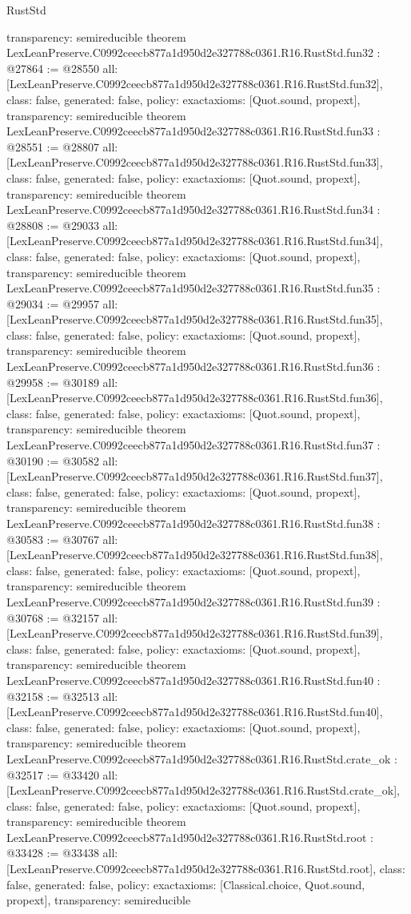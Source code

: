 \begin{lexlean}{RustStd}
\begin{coremodule}
{  transparency: semireducible
}
theorem LexLeanPreserve.C0992ceecb877a1d950d2e327788c0361.R16.RustStd.fun32 : @27864 := @28550 {
  all: [LexLeanPreserve.C0992ceecb877a1d950d2e327788c0361.R16.RustStd.fun32],
  class: false,
  generated: false,
  policy: exact{axioms: [Quot.sound, propext]},
  transparency: semireducible
}
theorem LexLeanPreserve.C0992ceecb877a1d950d2e327788c0361.R16.RustStd.fun33 : @28551 := @28807 {
  all: [LexLeanPreserve.C0992ceecb877a1d950d2e327788c0361.R16.RustStd.fun33],
  class: false,
  generated: false,
  policy: exact{axioms: [Quot.sound, propext]},
  transparency: semireducible
}
theorem LexLeanPreserve.C0992ceecb877a1d950d2e327788c0361.R16.RustStd.fun34 : @28808 := @29033 {
  all: [LexLeanPreserve.C0992ceecb877a1d950d2e327788c0361.R16.RustStd.fun34],
  class: false,
  generated: false,
  policy: exact{axioms: [Quot.sound, propext]},
  transparency: semireducible
}
theorem LexLeanPreserve.C0992ceecb877a1d950d2e327788c0361.R16.RustStd.fun35 : @29034 := @29957 {
  all: [LexLeanPreserve.C0992ceecb877a1d950d2e327788c0361.R16.RustStd.fun35],
  class: false,
  generated: false,
  policy: exact{axioms: [Quot.sound, propext]},
  transparency: semireducible
}
theorem LexLeanPreserve.C0992ceecb877a1d950d2e327788c0361.R16.RustStd.fun36 : @29958 := @30189 {
  all: [LexLeanPreserve.C0992ceecb877a1d950d2e327788c0361.R16.RustStd.fun36],
  class: false,
  generated: false,
  policy: exact{axioms: [Quot.sound, propext]},
  transparency: semireducible
}
theorem LexLeanPreserve.C0992ceecb877a1d950d2e327788c0361.R16.RustStd.fun37 : @30190 := @30582 {
  all: [LexLeanPreserve.C0992ceecb877a1d950d2e327788c0361.R16.RustStd.fun37],
  class: false,
  generated: false,
  policy: exact{axioms: [Quot.sound, propext]},
  transparency: semireducible
}
theorem LexLeanPreserve.C0992ceecb877a1d950d2e327788c0361.R16.RustStd.fun38 : @30583 := @30767 {
  all: [LexLeanPreserve.C0992ceecb877a1d950d2e327788c0361.R16.RustStd.fun38],
  class: false,
  generated: false,
  policy: exact{axioms: [Quot.sound, propext]},
  transparency: semireducible
}
theorem LexLeanPreserve.C0992ceecb877a1d950d2e327788c0361.R16.RustStd.fun39 : @30768 := @32157 {
  all: [LexLeanPreserve.C0992ceecb877a1d950d2e327788c0361.R16.RustStd.fun39],
  class: false,
  generated: false,
  policy: exact{axioms: [Quot.sound, propext]},
  transparency: semireducible
}
theorem LexLeanPreserve.C0992ceecb877a1d950d2e327788c0361.R16.RustStd.fun40 : @32158 := @32513 {
  all: [LexLeanPreserve.C0992ceecb877a1d950d2e327788c0361.R16.RustStd.fun40],
  class: false,
  generated: false,
  policy: exact{axioms: [Quot.sound, propext]},
  transparency: semireducible
}
theorem LexLeanPreserve.C0992ceecb877a1d950d2e327788c0361.R16.RustStd.crate_ok : @32517 := @33420 {
  all: [LexLeanPreserve.C0992ceecb877a1d950d2e327788c0361.R16.RustStd.crate_ok],
  class: false,
  generated: false,
  policy: exact{axioms: [Quot.sound, propext]},
  transparency: semireducible
}
theorem LexLeanPreserve.C0992ceecb877a1d950d2e327788c0361.R16.RustStd.root : @33428 := @33438 {
  all: [LexLeanPreserve.C0992ceecb877a1d950d2e327788c0361.R16.RustStd.root],
  class: false,
  generated: false,
  policy: exact{axioms: [Classical.choice, Quot.sound, propext]},
  transparency: semireducible
}


\end{coremodule}
\end{lexlean}
